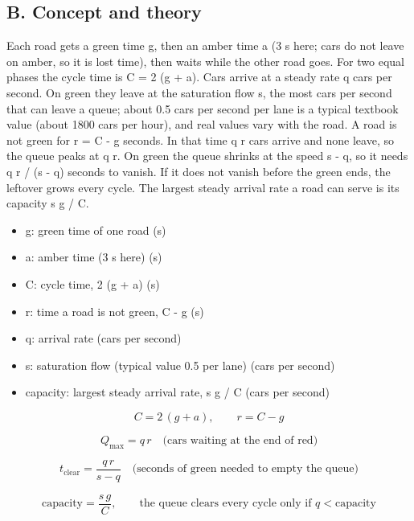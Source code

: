 \documentclass[11pt,a4paper]{article}
\begin{document}
\subsection*{B. Concept and theory}
Each road gets a green time g, then an amber time a (3 s here; cars do not leave on amber, so it is lost time), then waits while the other road goes. For two equal phases the cycle time is C = 2 (g + a). Cars arrive at a steady rate q cars per second. On green they leave at the saturation flow s, the most cars per second that can leave a queue; about 0.5 cars per second per lane is a typical textbook value (about 1800 cars per hour), and real values vary with the road. A road is not green for r = C - g seconds. In that time q r cars arrive and none leave, so the queue peaks at q r. On green the queue shrinks at the speed s - q, so it needs q r / (s - q) seconds to vanish. If it does not vanish before the green ends, the leftover grows every cycle. The largest steady arrival rate a road can serve is its capacity s g / C.

\begin{itemize}[nosep]
\item g: green time of one road (s)
\item a: amber time (3 s here) (s)
\item C: cycle time, 2 (g + a) (s)
\item r: time a road is not green, C - g (s)
\item q: arrival rate (cars per second)
\item s: saturation flow (typical value 0.5 per lane) (cars per second)
\item capacity: largest steady arrival rate, s g / C (cars per second)
\end{itemize}

\begin{equation*}
C = 2\,(g + a),\qquad r = C - g
\end{equation*}

\begin{equation*}
Q_{\max} = q\,r\quad\text{(cars waiting at the end of red)}
\end{equation*}

\begin{equation*}
t_{\text{clear}} = \frac{q\,r}{s - q}\quad\text{(seconds of green needed to empty the queue)}
\end{equation*}

\begin{equation*}
\text{capacity} = \frac{s\,g}{C},\qquad \text{the queue clears every cycle only if } q < \text{capacity}
\end{equation*}
\end{document}

